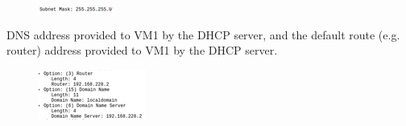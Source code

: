 \documentclass{article}
\begin{document}
\begin{figure}[h!]
\centering
\includegraphics[scale=1.0]{Q8b.png}
\caption{}
\end{figure}

DNS address provided to VM1 by the DHCP server, and the default route (e.g. router) address provided to VM1 by the DHCP server.\\
\begin{figure}[h!]
\centering
\includegraphics[scale=1.0]{Q8c.png}
\caption{}
\end{figure}
\end{document}
